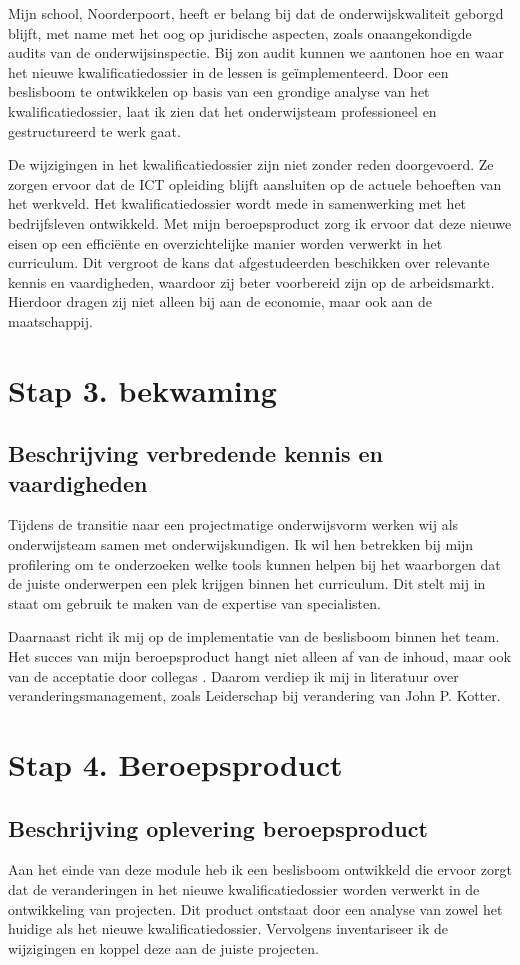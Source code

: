 Mijn school, Noorderpoort, heeft er belang bij dat de onderwijskwaliteit geborgd blijft, met name met het oog op juridische aspecten, zoals onaangekondigde audits van de onderwijsinspectie. Bij zo\textquotesingle n audit kunnen we aantonen hoe en waar het nieuwe kwalificatiedossier in de lessen is geïmplementeerd. Door een beslisboom te ontwikkelen op basis van een grondige analyse van het kwalificatiedossier, laat ik zien dat het onderwijsteam professioneel en gestructureerd te werk gaat.

De wijzigingen in het kwalificatiedossier zijn niet zonder reden doorgevoerd. Ze zorgen ervoor dat de ICT opleiding blijft aansluiten op de actuele behoeften van het werkveld. Het kwalificatiedossier wordt mede in samenwerking met het bedrijfsleven ontwikkeld. Met mijn beroepsproduct zorg ik ervoor dat deze nieuwe eisen op een efficiënte en overzichtelijke manier worden verwerkt in het curriculum. Dit vergroot de kans dat afgestudeerden beschikken over relevante kennis en vaardigheden, waardoor zij beter voorbereid zijn op de arbeidsmarkt. Hierdoor dragen zij niet alleen bij aan de economie, maar ook aan de maatschappij.

\section{Stap 3. bekwaming}
\subsection{Beschrijving verbredende kennis en vaardigheden}
Tijdens de transitie naar een projectmatige onderwijsvorm werken wij als onderwijsteam samen met onderwijskundigen. Ik wil hen betrekken bij mijn profilering om te onderzoeken welke tools kunnen helpen bij het waarborgen dat de juiste onderwerpen een plek krijgen binnen het curriculum. Dit stelt mij in staat om gebruik te maken van de expertise van specialisten.

Daarnaast richt ik mij op de implementatie van de beslisboom binnen het team. Het succes van mijn beroepsproduct hangt niet alleen af van de inhoud, maar ook van de acceptatie door collega\textquotesingle s
. Daarom verdiep ik mij in literatuur over veranderingsmanagement, zoals Leiderschap bij verandering van John P. Kotter.

\section{Stap 4. Beroepsproduct}
\subsection{Beschrijving oplevering beroepsproduct}
Aan het einde van deze module heb ik een beslisboom ontwikkeld die ervoor zorgt dat de veranderingen in het nieuwe kwalificatiedossier worden verwerkt in de ontwikkeling van projecten. Dit product ontstaat door een analyse van zowel het huidige als het nieuwe kwalificatiedossier. Vervolgens inventariseer ik de wijzigingen en koppel deze aan de juiste projecten.

